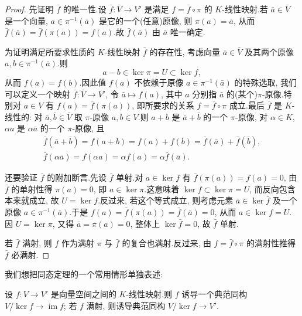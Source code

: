 \begin{proof}
先证明 $\bar{f}$ 的唯一性.设 $\bar{f} \colon \bar{V} \longrightarrow V'$ 是满足 $f = \bar{f} \circ \pi$ 的 $K$-线性映射.若 $\bar{a} \in \bar{V}$ 是一个向量, $a \in \pi^{-1}(\bar{a})$ 是它的一个(任意)原像, 则 $\pi(a) = \bar{a}$, 从而 $\bar{f}(\bar{a}) = \bar{f}(\pi(a)) = f(a)$.故 $\bar{f}(\bar{a})$ 由 $\bar{a}$ 唯一确定.

为证明满足所要求性质的 $K$-线性映射 $\bar{f}$ 的存在性, 考虑向量 $\bar{a} \in \bar{V}$ 及其两个原像 $a, b \in \pi^{-1}(\bar{a})$.则
\[
a - b \in \ker \pi = U \subset \ker f,
\]
从而 $f(a) = f(b)$.因此值 $f(a)$ 不依赖于原像 $a \in \pi^{-1}(\bar{a})$ 的特殊选取, 我们可以定义一个映射 $\bar{f} \colon \bar{V} \longrightarrow V'$, 令 $\bar{a} \longmapsto f(a)$, 其中 $a$ 分别指 $\bar{a}$ 的(某个)$\pi$-原像.特别对 $a \in V$ 有 $f(a) = \bar{f}(\pi(a))$, 即所要求的关系 $f = \bar{f} \circ \pi$ 成立.最后 $\bar{f}$ 是 $K$-线性的: 对 $\bar{a}, \bar{b} \in \bar{V}$ 取 $\pi$-原像 $a, b \in V$.则 $a + b$ 是 $\bar{a} + \bar{b}$ 的一个 $\pi$-原像, 对 $\alpha \in K$, $\alpha a$ 是 $\alpha\bar{a}$ 的一个 $\pi$-原像, 且
\[
\begin{array}{c}
\bar{f}(\bar{a} + \bar{b}) = f(a + b) = f(a) + f(b) = \bar{f}(\bar{a}) + \bar{f}(\bar{b}), \\
\bar{f}(\alpha\bar{a}) = f(\alpha a) = \alpha f(a) = \alpha\bar{f}(\bar{a})\text{.}
\end{array}
\]

还要验证 $\bar{f}$ 的附加断言.先设 $\bar{f}$ 单射.对 $a \in \ker f$ 有 $\bar{f}(\pi(a)) = f(a) = 0$, 由 $\bar{f}$ 的单射性得 $\pi(a) = 0$, 即 $a \in \ker \pi$.这意味着 $\ker f \subset \ker \pi = U$, 而反向包含本来就成立, 故 $U = \ker f$.反过来, 若这个等式成立, 则考虑元素 $\bar{a} \in \ker \bar{f}$ 及一个原像 $a \in \pi^{-1}(\bar{a})$.于是 $f(a) = \bar{f}(\pi(a)) = \bar{f}(\bar{a}) = 0$, 从而 $a \in \ker f = U$.因 $U = \ker \pi$, 又得 $\bar{a} = \pi(a) = 0$, 整体上 $\ker \bar{f} = 0$, 故 $\bar{f}$ 单射.

若 $\bar{f}$ 满射, 则 $f$ 作为满射 $\pi$ 与 $\bar{f}$ 的复合也满射.反过来, 由 $f = \bar{f} \circ \pi$ 的满射性推得 $\bar{f}$ 必满射.
\end{proof}

我们想把同态定理的一个常用情形单独表述:

\begin{corollary}\label{cor:2.2.9}
设 $f \colon V \longrightarrow V'$ 是向量空间之间的 $K$-线性映射.则 $f$ 诱导一个典范同构 $V/\ker f \longrightarrow \operatorname{im} f$; 若 $f$ 满射, 则诱导典范同构 $V/\ker f \longrightarrow V'$.
\end{corollary}

